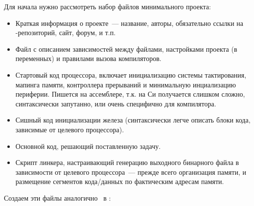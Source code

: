
\label{labhello}

Для начала нужно рассмотреть набор файлов минимального проекта:

\begin{itemize}

\item {}

Краткая информация о проекте\ --- название, авторы, обязательно ссылки на
\git-репозиторий, сайт, форум, и т.п.
 
\item {}

Файл с описанием зависимостей между файлами, настройками проекта (в переменных)
и правилами вызова компиляторов.

\item {}

Стартовый код процессора, включает инициализацию системы тактирования, мапинга
памяти, контроллера прерываний и минимальную инциализацию периферии.
Пишется на ассемблере, т.к. на Си получается слишком сложно, синтаксически
запутанно, или очень специфично для компилятора.

\item {}

Сишный код инициализации железа (синтаксически легче описать блоки кода,
зависимые от целевого процессора).

\item {}

Основной код, решающий поставленную задачу. 

\item {}

Скрипт линкера, настраивающий генерацию выходного бинарного файла в 
зависимости от целевого процессора\ --- прежде всего организация памяти,
и размещение сегментов кода/данных по фактическим адресам памяти.

\end{itemize}

\bigskip Создаем эти файлы аналогично \makefile\ в :

\bigskip{}



